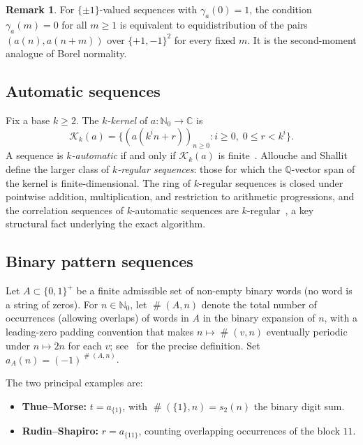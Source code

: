 \documentclass[11pt]{article}
\theoremstyle{definition}
\newtheorem{remark}[theorem]{Remark}
\DeclareMathOperator{\occ}{\#}
\newcommand{\kker}{\mathcal{K}}
\newcommand{\N}{\mathbb{N}}
\begin{document}
\begin{remark}
For $\{\pm1\}$-valued sequences with $\gamma_a(0) = 1$, the condition
$\gamma_a(m) = 0$ for all $m \geq 1$ is equivalent to equidistribution
of the pairs $(a(n), a(n+m))$ over $\{+1,-1\}^2$ for every fixed $m$.
It is the second-moment analogue of Borel normality.
\end{remark}

\subsection{Automatic sequences}

Fix a base $k \geq 2$.
The \emph{$k$-kernel} of $a : \N_0 \to \mathbb{C}$ is
\[
    \kker_k(a)
    = \bigl\{(a(k^i n + r))_{n \geq 0}
      : i \geq 0,\; 0 \leq r < k^i\bigr\}.
\]
A sequence is \emph{$k$-automatic} if and only if $\kker_k(a)$ is
finite~\cite{AS03}.
Allouche and Shallit~\cite{AS92,AS03b} define the larger class of
\emph{$k$-regular sequences}: those for which the $\mathbb{Q}$-vector span
of the kernel is finite-dimensional. The ring of $k$-regular sequences
is closed under pointwise addition, multiplication, and restriction to
arithmetic progressions, and the correlation sequences of $k$-automatic
sequences are $k$-regular~\cite{Kon21}, a key structural fact underlying
the exact algorithm.

\subsection{Binary pattern sequences}

Let $A \subset \{0,1\}^+$ be a finite admissible set of non-empty binary
words (no word is a string of zeros). For $n \in \N_0$, let
$\occ(A, n)$ denote the total number of occurrences (allowing overlaps)
of words in $A$ in the binary expansion of $n$, with a leading-zero
padding convention that makes $n \mapsto \occ(v, n)$ eventually periodic
under $n \mapsto 2n$ for each $v$; see~\cite{Kon21} for the precise
definition. Set $a_A(n) = (-1)^{\occ(A,n)}$.

\medskip\noindent
The two principal examples are:
\begin{itemize}[leftmargin=2em]
  \item \textbf{Thue--Morse:} $t = a_{\{1\}}$, with $\occ(\{1\},n) = s_2(n)$
        the binary digit sum.
  \item \textbf{Rudin--Shapiro:} $r = a_{\{11\}}$, counting overlapping
        occurrences of the block $11$.
\end{itemize}
\end{document}
